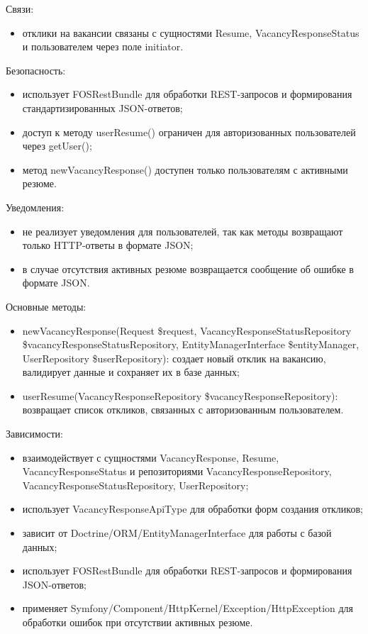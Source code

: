 Связи:
\begin{itemize}
	\item отклики на вакансии связаны с сущностями Resume, VacancyResponseStatus и пользователем через поле initiator.
\end{itemize}

Безопасность:
\begin{itemize}
	\item использует FOSRestBundle для обработки REST-запросов и формирования стандартизированных JSON-ответов;
	\item доступ к методу userResume() ограничен для авторизованных пользователей через getUser();
	\item метод newVacancyResponse() доступен только пользователям с активными резюме.
\end{itemize}

Уведомления:
\begin{itemize}
	\item не реализует уведомления для пользователей, так как методы возвращают только HTTP-ответы в формате JSON;
	\item в случае отсутствия активных резюме возвращается сообщение об ошибке в формате JSON.
\end{itemize}

Основные методы:
\begin{itemize}
	\item newVacancyResponse(Request \$request, VacancyResponseStatusRepository \$vacancyResponseStatusRepository, EntityManagerInterface \$entityManager, UserRepository \$userRepository): создает новый отклик на вакансию, валидирует данные и сохраняет их в базе данных;
	\item userResume(VacancyResponseRepository \$vacancyResponseRepository): возвращает список откликов, связанных с авторизованным пользователем.
\end{itemize}

Зависимости:
\begin{itemize}
	\item взаимодействует с сущностями VacancyResponse, Resume, VacancyResponseStatus и репозиториями VacancyResponseRepository, VacancyResponseStatusRepository, UserRepository;
	\item использует VacancyResponseApiType для обработки форм создания откликов;
	\item зависит от Doctrine/ORM/EntityManagerInterface для работы с базой данных;
	\item использует FOSRestBundle для обработки REST-запросов и формирования JSON-ответов;
	\item применяет Symfony/Component/HttpKernel/Exception/HttpException для обработки ошибок при отсутствии активных резюме.
\end{itemize}

